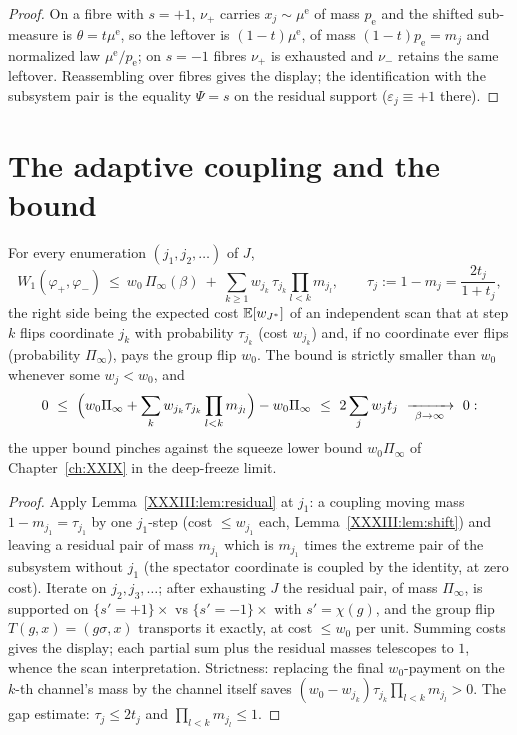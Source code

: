 \begin{proof}
On a fibre with $s=+1$, $\nu_+$ carries $x_j\sim\mu^{\mathrm e}$ of mass $p_{\mathrm e}$
and the shifted sub-measure is $\theta=t\mu^{\mathrm e}$, so the leftover is
$(1-t)\mu^{\mathrm e}$, of mass $(1-t)p_{\mathrm e}=m_j$ and normalized law
$\mu^{\mathrm e}/p_{\mathrm e}$; on $s=-1$ fibres $\nu_+$ is exhausted and $\nu_-$
retains the same leftover. Reassembling over fibres gives the display; the identification
with the subsystem pair is the equality $\Psi=s$ on the residual support
($\varepsilon_j\equiv+1$ there).
\end{proof}

\section{The adaptive coupling and the bound}\label{XXXIII:sec:bound}

\begin{theorem}\label{XXXIII:thm:upper}
For every enumeration $(j_1,j_2,\dots)$ of $J$,
\[
W_1(\varphi_+,\varphi_-)\ \le\
w_0\,\Pi_\infty(\beta)\ +\ \sum_{k\ge1}w_{j_k}\,\tau_{j_k}\prod_{l<k}m_{j_l},
\qquad \tau_j:=1-m_j=\frac{2t_j}{1+t_j},
\]
the right side being the expected cost $\mathbb{E}[w_{J^*}]$ of an independent scan that at step
$k$ flips coordinate $j_k$ with probability $\tau_{j_k}$ (cost $w_{j_k}$) and, if no
coordinate ever flips (probability $\Pi_\infty$), pays the group flip $w_0$. The bound is
strictly smaller than $w_0$ whenever some $w_j<w_0$, and
\[
0\ \le\ \Bigl(w_0\Pi_\infty+\sum_kw_{j_k}\tau_{j_k}\prod_{l<k}m_{j_l}\Bigr)-w_0\Pi_\infty
\ \le\ 2\sum_jw_jt_j\ \xrightarrow[\ \beta\to\infty\ ]{}\ 0 :
\]
the upper bound pinches against the squeeze lower bound $w_0\Pi_\infty$ of Chapter~\ref{ch:XXIX} in
the deep-freeze limit.
\end{theorem}

\begin{proof}
Apply Lemma~\ref{XXXIII:lem:residual} at $j_1$: a coupling moving mass $1-m_{j_1}=\tau_{j_1}$ by
one $j_1$-step (cost $\le w_{j_1}$ each, Lemma~\ref{XXXIII:lem:shift}) and leaving a residual
pair of mass $m_{j_1}$ which is $m_{j_1}$ times the extreme pair of the subsystem without
$j_1$ (the spectator coordinate is coupled by the identity, at zero cost). Iterate on
$j_2,j_3,\dots$; after exhausting $J$ the residual pair, of mass $\Pi_\infty$, is
supported on $\{s'=+1\}\times$ vs $\{s'=-1\}\times$ with $s'=\chi(g)$, and the group flip
$T(g,x)=(g\sigma,x)$ transports it exactly, at cost $\le w_0$ per unit. Summing costs
gives the display; each partial sum plus the residual masses telescopes to $1$, whence
the scan interpretation. Strictness: replacing the final $w_0$-payment on the $k$-th
channel's mass by the channel itself saves $(w_0-w_{j_k})\tau_{j_k}\prod_{l<k}m_{j_l}>0$.
The gap estimate: $\tau_j\le2t_j$ and $\prod_{l<k}m_{j_l}\le1$.
\end{proof}


